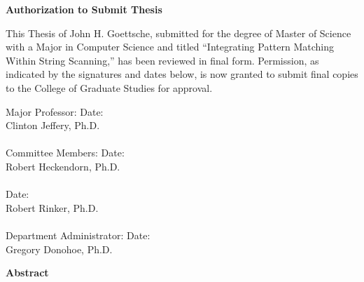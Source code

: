 \documentclass{article}
\begin{document}
\begin{center}
\textbf{Authorization to Submit Thesis}
\end{center}
This Thesis of John H. Goettsche, submitted for the degree of Master of Science with a Major in Computer Science and titled ``Integrating Pattern Matching Within String Scanning,'' has been reviewed in final form.  Permission, as indicated by the signatures and dates below, is now granted to submit final copies to the College of Graduate Studies for approval.\\
\vspace{0.3in}
\begin{singlespace}
\noindent
	Major Professor:\hspace{0.8in}\makebox[2.5in]{\hrulefill} Date: \makebox[1.0in]{\hrulefill} \\
	\-\hspace{2.0in}Clinton Jeffery, Ph.D.\\
	\vspace{0.1in}\\
	Committee Members:\hspace{0.5in}\makebox[2.5in]{\hrulefill} Date: \makebox[1.0in]{\hrulefill} \\
	\-\hspace{2.0in}Robert Heckendorn, Ph.D.\\
	\vspace{0.1in}\\
	\-\hspace{2.0in}\makebox[2.5in]{\hrulefill} Date: \makebox[1.0in]{\hrulefill} \\
	\-\hspace{2.0in}Robert Rinker, Ph.D.\\
	\vspace{0.1in}\\
	Department Administrator: \makebox[2.5in]{\hrulefill} Date: \makebox[1.0in]{\hrulefill} \\
	\-\hspace{2.0in}Gregory Donohoe, Ph.D.\\
\end{singlespace}

\pagebreak

\begin{center}
\textbf{Abstract}
\end{center}
\end{document}

